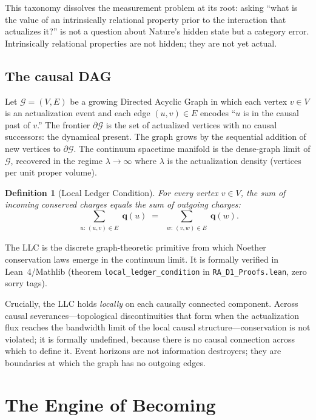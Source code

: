 \documentclass[11pt,twocolumn]{article}
\theoremstyle{plain}
\newtheorem{definition}[theorem]{Definition}
\theoremstyle{remark}
\newcommand{\DAG}{\mathcal{G}}
\newcommand{\partialG}{\partial\DAG}
\begin{document}
This taxonomy dissolves the measurement problem at its root: asking
``what is the value of an intrinsically relational property prior to
the interaction that actualizes it?'' is not a question about Nature's
hidden state but a category error.
Intrinsically relational properties are not hidden; they are not yet
actual.

\subsection{The causal DAG}

Let $\DAG = (V, E)$ be a growing Directed Acyclic Graph in which
each vertex $v \in V$ is an actualization event and each edge
$(u, v) \in E$ encodes ``$u$ is in the causal past of $v$.''
The frontier $\partialG$ is the set of actualized vertices with
no causal successors: the dynamical present.
The graph grows by the sequential addition of new vertices to
$\partialG$.
The continuum spacetime manifold is the dense-graph limit of $\DAG$,
recovered in the regime $\lambda \to \infty$ where $\lambda$ is
the actualization density (vertices per unit proper volume).

\begin{definition}[Local Ledger Condition]
For every vertex $v \in V$, the sum of incoming conserved charges
equals the sum of outgoing charges:
\begin{equation}
  \sum_{\substack{u:\,(u,v)\in E}} \mathbf{q}(u)
  \;=\;
  \sum_{\substack{w:\,(v,w)\in E}} \mathbf{q}(w).
  \label{eq:LLC}
\end{equation}
\end{definition}

The LLC is the discrete graph-theoretic primitive from which
Noether conservation laws emerge in the continuum limit.
It is formally verified in Lean~4/Mathlib (theorem
\texttt{local\_ledger\_condition} in \texttt{RA\_D1\_Proofs.lean},
zero sorry tags).

Crucially, the LLC holds \emph{locally} on each causally connected
component.
Across causal severances---topological discontinuities that form
when the actualization flux reaches the bandwidth limit of the
local causal structure---conservation is not violated; it is
formally undefined, because there is no causal connection across
which to define it.
Event horizons are not information destroyers; they are boundaries
at which the graph has no outgoing edges.

\section{The Engine of Becoming}
\label{sec:engine}
\end{document}
